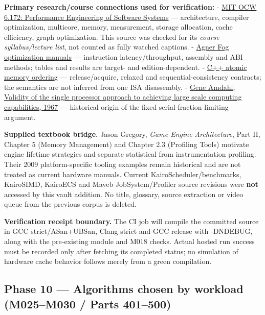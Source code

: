 \textbf{Primary research/course connections used for verification:} - \href{https://ocw.mit.edu/courses/6-172-performance-engineering-of-software-systems-fall-2018/video_galleries/lecture-videos/}{MIT OCW 6.172: Performance Engineering of Software Systems} --- architecture, compiler optimization, multicore, memory, measurement, storage allocation, cache efficiency, graph optimization. This source was checked for its \emph{course syllabus/lecture list}, not counted as fully watched captions. - \href{https://www.agner.org/optimize/}{Agner Fog optimization manuals} --- instruction latency/throughput, assembly and ABI methods; tables and results are target- and edition-dependent. - \href{https://en.cppreference.com/w/cpp/atomic/memory_order}{C++ atomic memory ordering} --- release/acquire, relaxed and sequential-consistency contracts; the semantics are not inferred from one ISA disassembly. - \href{https://doi.org/10.1145/1465482.1465560}{Gene Amdahl, Validity of the single processor approach to achieving large scale computing capabilities, 1967} --- historical origin of the fixed serial-fraction limiting argument.

\textbf{Supplied textbook bridge.} Jason Gregory, \emph{Game Engine Architecture}, Part II, Chapter 5 (Memory Management) and Chapter 2.3 (Profiling Tools) motivate engine lifetime strategies and separate statistical from instrumentation profiling. Their 2009 platform-specific tooling examples remain historical and are not treated as current hardware manuals. Current KairoScheduler/benchmarks, KairoSIMD, KairoECS and Maveb JobSystem/Profiler source revisions were \textbf{not} accessed by this vault addition. No title, glossary, source extraction or video queue from the previous corpus is deleted.

\textbf{Verification receipt boundary.} The CI job will compile the committed source in GCC strict/ASan+UBSan, Clang strict and GCC release with -DNDEBUG, along with the pre-existing module and M018 checks. Actual hosted run success must be recorded only after fetching its completed status; no simulation of hardware cache behavior follows merely from a green compilation.

\subsection{Phase 10 --- Algorithms chosen by workload (M025--M030 / Parts 401--500)}\label{appendix-a103e7846d21-phase-10-algorithms-chosen-by-workload-m025m030-parts-401500}


